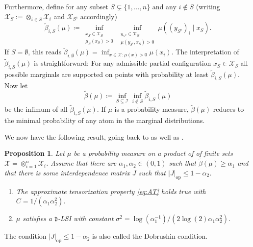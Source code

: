 \documentclass[a4paper,12pt]{amsart}
\numberwithin{equation}{section}
\newtheorem{proposition}[satz]{Proposition}
\theoremstyle{remark}
\newcommand				{\dpartial}	{\mathfrak{d}}
\begin{document}
Furthermore, define for any subset $S \subsetneq \{1, \ldots, n\}$ and any $i \notin S$ (writing $\mathcal{X}_S := \otimes_{i \in S} \mathcal{X}_i$ and $\mathcal{X}_{S^c}$ accordingly)
\begin{equation}\label{eqn:DefiBetaTilde}
  \tilde{\beta}_{i,S}(\mu) \coloneqq \inf_{\substack{x_S \in \mathcal{X}_S \\ \mu_S(x_S) > 0}} \inf_{\substack{y_{S^c} \in \mathcal{X}_{S^c} \\ \mu(y_{S^c}, x_{S}) > 0} }  \mu ( (y_{S^c})_i \mid x_S).
\end{equation}
If $S = \emptyset$, this reads $\tilde{\beta}_{i,\emptyset}(\mu) = \inf_{x \in \mathcal{X} : \mu(x) > 0} \mu(x_i).$ The interpretation of $\tilde{\beta}_{i,S}(\mu)$ is straightforward: For any admissible partial configuration $x_S \in \mathcal{X}_S$ all possible marginals are supported on points with probability at least $\tilde{\beta}_{i,S}(\mu)$. Now let
\begin{equation*} %
  \tilde{\beta}(\mu) \coloneqq \inf_{S \subsetneq \mathcal{I}} \inf_{i \notin S} \tilde{\beta}_{i,S}(\mu)
\end{equation*}
be the infimum of all $\tilde{\beta}_{i,S}(\mu)$. If $\mu$ is a probability measure, $\tilde{\beta}(\mu)$ reduces to the minimal probability of any atom in the marginal distributions.

We now have the following result, going back to \cite{Mar19} as well as \cite[Th.\ 4.2]{GSS19}.

\begin{proposition}\label{prop:AT+LSI}
Let $\mu$ be a probability measure on a product of of finite sets $\mathcal{X} = \otimes_{i = 1}^n \mathcal{X}_i$. Assume that there are $\alpha_1, \alpha_2 \in (0,1)$ such that $\tilde{\beta}(\mu) \ge \alpha_1$ and that there is some interdependence matrix $J$ such that $\lvert J \rvert_\mathrm{op} \le 1 - \alpha_2$.
\begin{enumerate}
\item The approximate tensorization property \eqref{eq:AT} holds true with $C= 1/(\alpha_1\alpha_2^2)$.
\item $\mu$ satisfies a $\dpartial$-LSI with constant $\sigma^2 = \log(\alpha_1^{-1})/(2\log(2)\alpha_1\alpha_2^2)$.
\end{enumerate}
\end{proposition}

The condition $\lvert J \rvert_\mathrm{op} \le 1 - \alpha_2$ is also called the Dobrushin condition.
\end{document}
